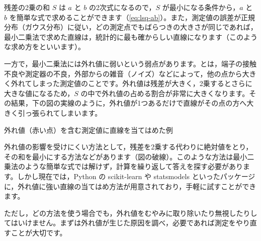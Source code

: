 \begin{hosoku}
残差の2乗の和 $S$ は $a$ と $b$ の2次式になるので，$S$ が最小になる条件から，$a$ と $b$ を簡単な式で求めることができます（\cref{eq:lsq-ab}）。また，測定値の誤差が正規分布（ガウス分布）に従い，どの測定点でもばらつきの大きさが同じであれば，最小二乗法で求めた直線は，統計的に最も確からしい直線になります（このような求め方をといいます）。

一方で，最小二乗法には外れ値に弱いという弱点があります。とは，端子の接触不良や測定器の不良，外部からの雑音（ノイズ）などによって，他の点から大きく外れてしまった測定値のことです。外れ値は残差が大きく，2乗するとさらに大きな値になるため，$S$ の中で外れ値の占める割合が非常に大きくなります。その結果，下の図の実線のように，外れ値が1つあるだけで直線がその点の方へ大きく引っ張られてしまいます。

\begin{center}

  {\small 外れ値（赤い点）を含む測定値に直線を当てはめた例}
\end{center}

外れ値の影響を受けにくい方法として，残差を2乗する代わりに絶対値をとり，その和を最小にする方法などがあります（図の破線）。このような方法は最小二乗法のような簡単な式では解けず，計算を繰り返して答えを探す必要があります。しかし現在では，Python の scikit-learn や statsmodels といったパッケージに，外れ値に強い直線の当てはめ方法が用意されており，手軽に試すことができます。

ただし，どの方法を使う場合でも，外れ値をむやみに取り除いたり無視したりしてはいけません。まずは外れ値が生じた原因を調べ，必要であれば測定をやり直すことが大切です。
\end{hosoku}
